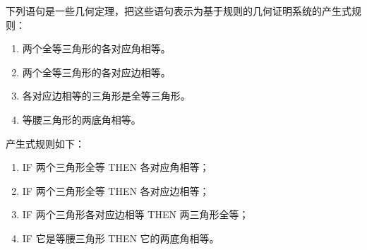 \begin{question}
下列语句是一些几何定理，把这些语句表示为基于规则的几何证明系统的产生式规则：
	\begin{enumerate}
		\item 两个全等三角形的各对应角相等。
		\item 两个全等三角形的各对应边相等。 
		\item 各对应边相等的三角形是全等三角形。
		\item 等腰三角形的两底角相等。 
	\end{enumerate}
\end{question}
\begin{solution}
产生式规则如下：
	\begin{enumerate}
		\item IF 两个三角形全等 THEN 各对应角相等；
		\item IF 两个三角形全等 THEN 各对应边相等；
		\item IF 两个三角形各对应边相等 THEN 两三角形全等；
		\item IF 它是等腰三角形 THEN 它的两底角相等。
	\end{enumerate}
\end{solution}